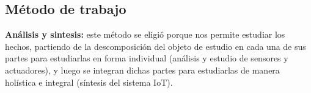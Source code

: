 \documentclass[a4paper, 12pt]{article}
\begin{document}
\subsection{Método de trabajo}



\textbf{Análisis y sintesis:} este método se eligió porque nos permite estudiar los hechos, partiendo de la descomposición del objeto de estudio en cada una de sus partes para estudiarlas en forma individual (análisis y estudio de sensores y actuadores), y luego se integran dichas partes para estudiarlas de manera holística e integral (síntesis del sistema IoT).
\end{document}
